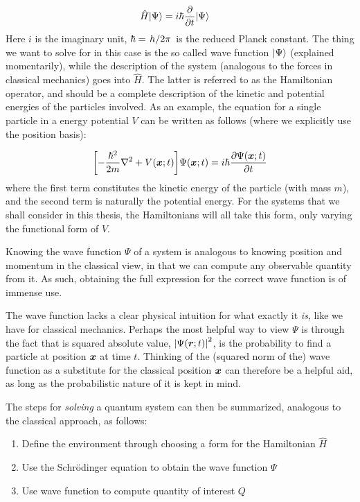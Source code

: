\documentclass[Thesis.tex]{subfiles}
\begin{document}
\begin{align}
    \hat H| \Psi \rangle &= i\hbar \pdv{}{t}| \Psi \rangle\label{eq:schrodinger-time-dependent-general}
\end{align}
%
Here $i$ is the imaginary unit, $\hbar=\flatfrac{h}{2\pi}$ is the reduced Planck constant.
The thing we want to solve for in this case is the so called wave function $| \Psi \rangle$
(explained momentarily), while the description of the system (analogous to the forces in
classical mechanics) goes into $\hat H$. The latter is referred to as the Hamiltonian
operator, and should be a complete description of the kinetic and potential energies of
the particles involved. As an example, the equation for a single particle in a energy
potential $V$ can be written as follows (where we explicitly use the position basis):

\begin{align}
    \qty[-\frac{\hbar^2}{2m} \laplacian + V(\vb x; t)]\Psi(\vb x;t) =
    i\hbar\pdv{\Psi(\vb x; t)}{t}\label{eq:schrodinger-time-dependent-position-basis}
\end{align}
%
where the first term constitutes the kinetic energy of the particle (with mass $m$), and the second term is
naturally the potential energy. For the systems that we shall consider in this thesis, the
Hamiltonians will all take this form, only varying the functional form of $V$.

Knowing the wave function $\Psi$ of a system is analogous to knowing position and momentum
in the classical view, in that we can compute any observable quantity from it. As such,
obtaining the full expression for the correct wave function is of immense use.

The wave function lacks a clear physical intuition for what exactly it \emph{is},
like we have for classical mechanics. Perhaps the most helpful way to view $\Psi$ is
through the fact that is squared absolute value, $\abs{\Psi(\bm{r}; t)}^2$, is the
probability to find a particle at position $\bm{x}$ at time $t$. Thinking of the (squared
norm of the) wave function as a substitute for the classical position $\bm{x}$ can
therefore be a helpful aid, as long as the probabilistic nature of it is kept in mind.

The steps for \emph{solving} a quantum system can then be summarized, analogous to the
classical approach, as follows:
\begin{enumerate}
    \item Define the environment through choosing a form for the Hamiltonian $\hat H$
    \item Use the Schrödinger equation to obtain the wave function $\Psi$
    \item Use wave function to compute quantity of interest $Q$
\end{enumerate}
\end{document}
